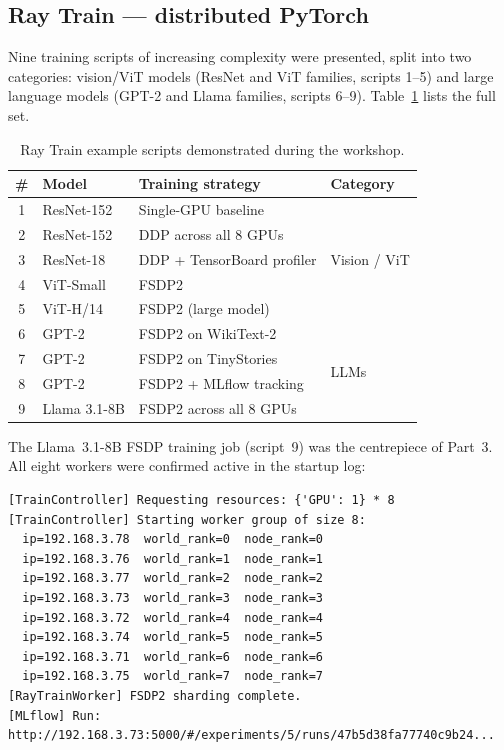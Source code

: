 \documentclass[12pt,a4paper]{article}
\begin{document}
\subsection{Ray Train --- distributed PyTorch}

Nine training scripts of increasing complexity were presented, split
into two categories: vision/ViT models (ResNet and ViT families, scripts
1--5) and large language models (GPT-2 and Llama families, scripts
6--9). Table~\ref{tab:train} lists the full set.

\begin{table}[H]
\centering
\caption{Ray Train example scripts demonstrated during the workshop.}
\label{tab:train}
\begin{tabularx}{\textwidth}{clXl}
\toprule
\textbf{\#} & \textbf{Model} & \textbf{Training strategy} & \textbf{Category} \\
\midrule
1 & ResNet-152  & Single-GPU baseline                & \multirow{5}{*}{Vision / ViT} \\
2 & ResNet-152  & DDP across all 8 GPUs              & \\
3 & ResNet-18   & DDP + TensorBoard profiler          & \\
4 & ViT-Small   & FSDP2                              & \\
5 & ViT-H/14    & FSDP2 (large model)                & \\
\midrule
6 & GPT-2       & FSDP2 on WikiText-2                & \multirow{4}{*}{LLMs} \\
7 & GPT-2       & FSDP2 on TinyStories               & \\
8 & GPT-2       & FSDP2 + MLflow tracking            & \\
9 & Llama 3.1-8B & FSDP2 across all 8 GPUs           & \\
\bottomrule
\end{tabularx}
\end{table}

The Llama~3.1-8B FSDP training job (script~9) was the centrepiece of
Part~3. All eight workers were confirmed active in the startup log:

\begin{lstlisting}[style=terminal, caption={Ray Train log confirming 8-GPU FSDP worker group.}]
[TrainController] Requesting resources: {'GPU': 1} * 8
[TrainController] Starting worker group of size 8:
  ip=192.168.3.78  world_rank=0  node_rank=0
  ip=192.168.3.76  world_rank=1  node_rank=1
  ip=192.168.3.77  world_rank=2  node_rank=2
  ip=192.168.3.73  world_rank=3  node_rank=3
  ip=192.168.3.72  world_rank=4  node_rank=4
  ip=192.168.3.74  world_rank=5  node_rank=5
  ip=192.168.3.71  world_rank=6  node_rank=6
  ip=192.168.3.75  world_rank=7  node_rank=7
[RayTrainWorker] FSDP2 sharding complete.
[MLflow] Run: http://192.168.3.73:5000/#/experiments/5/runs/47b5d38fa77740c9b24...
\end{lstlisting}
\end{document}
